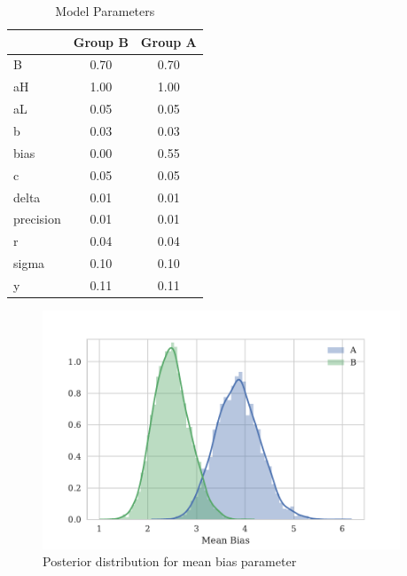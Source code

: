 \documentclass[a4paper,12pt]{article}
\begin{document}
\begin{appendices}
\begin{table}
  \caption{Model Parameters}
  \label{table:model-params}
  \begin{center}
    \begin{tabular}{lcc}
      \hline
      & Group B & Group A  \\
      \hline
      \hline
      B         &    0.70 &    0.70  \\
      aH        &    1.00 &    1.00  \\
      aL        &    0.05 &    0.05  \\
      b         &    0.03 &    0.03  \\
      bias      &    0.00 &    0.55  \\
      c         &    0.05 &    0.05  \\
      delta     &    0.01 &    0.01  \\
      precision &    0.01 &    0.01  \\
      r         &    0.04 &    0.04  \\
      sigma     &    0.10 &    0.10  \\
      y         &    0.11 &    0.11  \\
      \hline
    \end{tabular}
  \end{center}
\end{table}

\begin{figure}[h]
    \centering
    \includegraphics[width=0.95\textwidth]{../experiments/mean-bias}
    \caption{Posterior distribution for mean bias parameter}
    \label{fig:posterior-mean-bias}
\end{figure}


\end{appendices}
\end{document}
